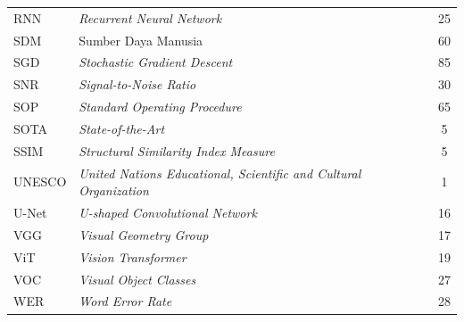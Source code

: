 \documentclass[12pt,a4paper]{article}
\begin{document}
\begin{longtable}{@{} l >{\raggedright\arraybackslash}p{7.5cm} c @{}}
RNN & \textit{Recurrent Neural Network}  & 25 \\
SDM & Sumber Daya Manusia & 60 \\
SGD & \textit{Stochastic Gradient Descent} & 85 \\
SNR & \textit{Signal-to-Noise Ratio}  & 30 \\
SOP & \textit{Standard Operating Procedure}  & 65 \\
SOTA & \textit{State-of-the-Art} & 5 \\
SSIM & \textit{Structural Similarity Index Measure} & 5 \\
UNESCO & \textit{United Nations Educational, Scientific and Cultural Organization} & 1 \\
U-Net & \textit{U-shaped Convolutional Network} & 16 \\
VGG & \textit{Visual Geometry Group} & 17 \\
ViT & \textit{Vision Transformer} & 19 \\
VOC & \textit{Visual Object Classes} & 27 \\
WER & \textit{Word Error Rate} & 28 \\

\end{longtable}

\newpage


\label{subsec:daftar-lambang}
\vspace{0.8em}
\end{document}
